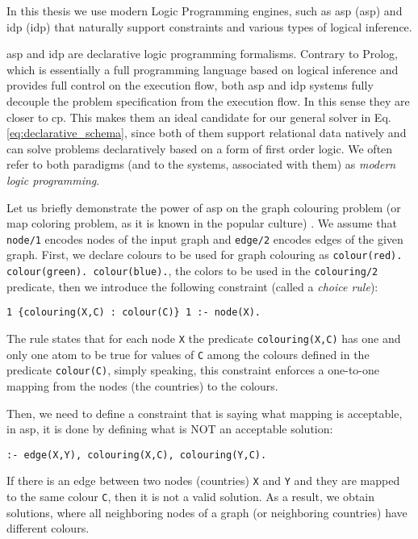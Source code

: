 In this thesis we use modern Logic Programming engines, such
as \acrlong{asp} (\acrshort{asp}) \parencite{ASPbook,whatisasp} and
\acrlong{idp} (\acrshort{idp})
\parencite{idp} %
that naturally support constraints and various types of logical
inference.

\pubrev
\acrshort{asp} and \acrshort{idp} are declarative logic programming
formalisms. Contrary to Prolog, which is essentially a full
programming language based on logical inference and provides full
control on the execution flow,  both \acrshort{asp} and \acrshort{idp}
systems fully decouple the problem specification from the execution
flow. In this sense they are closer to \acrlong{cp}. This makes them
an ideal candidate for our general solver in Eq. 
\ref{eq:declarative_schema}, since both of them support relational
data natively and can solve problems declaratively based on a form of
first order logic. We often refer to both paradigms (and to the systems,
associated with them) as \textit{modern logic programming}.

Let us briefly demonstrate the power of \acrshort{asp} on the graph colouring problem (or map coloring problem, as it is known in the popular culture) \parencite{ASPbook}. We assume that \texttt{node/1} encodes nodes of the input graph and \texttt{edge/2} encodes edges of the given graph. First, we declare colours to be used for graph colouring as \texttt{colour(red). colour(green). colour(blue).}, the colors to be used in the \texttt{colouring/2} predicate, then we introduce the following constraint (called a \textit{choice rule}):
\begin{verbatim}
1 {colouring(X,C) : colour(C)} 1 :- node(X).
\end{verbatim}
The rule states that for each node \texttt{X} the predicate \texttt{colouring(X,C)} has one and only one atom to be true for values of \texttt{C} among the colours defined in the predicate \texttt{colour(C)}, simply speaking, this constraint enforces a one-to-one mapping from the nodes (the countries) to the colours.

Then, we need to define a constraint that is saying what mapping is acceptable, in \acrshort{asp}, it is done by defining what is NOT an acceptable solution:
\begin{verbatim}
:- edge(X,Y), colouring(X,C), colouring(Y,C).
\end{verbatim}
If there is an edge between two nodes (countries) \texttt{X} and \texttt{Y} and they are mapped to the same colour \texttt{C}, then it is not a valid solution. As a result, we obtain solutions, where all neighboring nodes of a graph (or neighboring countries) have different colours.
\pubrevend

